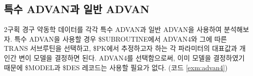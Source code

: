 \documentclass[
  10pt,
  krantz2,
  a4paper]{krantz}
\theoremstyle{definition}
\theoremstyle{definition}
\theoremstyle{definition}
\theoremstyle{remark}
\begin{document}
\hypertarget{uxd2b9uxc218-advanuxacfc-uxc77cuxbc18-advan}{%
\subsection{\texorpdfstring{특수 ADVAN과 일반 ADVAN}{특수 ADVAN과 일반 ADVAN}}\label{uxd2b9uxc218-advanuxacfc-uxc77cuxbc18-advan}}

2구획 경구 약동학 데이터를 각각 특수 ADVAN과 일반 ADVAN을 사용하여 분석해보자. 특수 ADVAN을 사용할 경우 \$SUBROUTINE에서 ADVAN4와 그에 따른 TRANS 서브루틴을 선택하고, \$PK에서 추정하고자 하는 각 파라미터의 대표값과 개인간 변이 모델을 결정하면 된다. ADVAN4를 선택함으로써, 이미 모델을 결정하였기 때문에 \$MODEL과 \$DES 레코드는 사용할 필요가 없다. (코드 \ref{exm:advan4})
\end{document}
